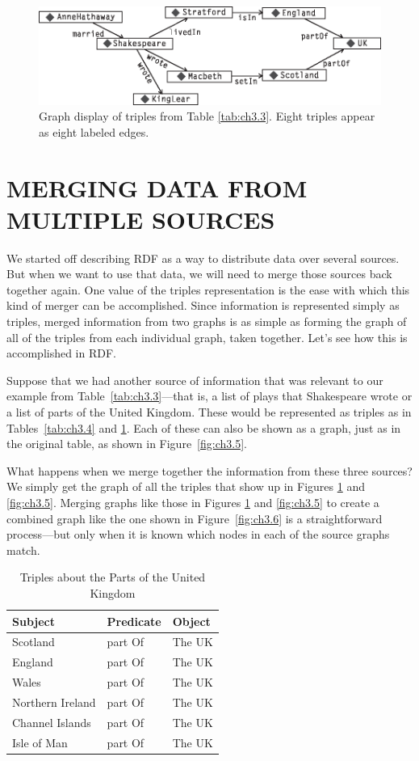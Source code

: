 \begin{figure}
    \centering
    \includegraphics[width=5.0in]{media/ch3/f03-04-9780123859655.eps}
    \caption{Graph display of triples from Table \ref{tab:ch3.3}. Eight triples appear as eight labeled edges.}
    \label{fig:ch3.4}
\end{figure}


\section{MERGING DATA FROM MULTIPLE SOURCES}

We started off describing RDF as a way to distribute data over several
sources. But when we want to use that data, we will need to merge those
sources back together again. One value of the triples representation is
the ease with which this kind of merger can be accomplished. Since
information is represented simply as triples, merged information from
two graphs is as simple as forming the graph of all of the triples from
each individual graph, taken together. Let's see how this is
accomplished in RDF.

Suppose that we had another source of information that was relevant to
our example from Table~\ref{tab:ch3.3}---that is, a list of plays that Shakespeare wrote or a list of parts
of the United Kingdom. These would be represented as triples as in
Tables~\ref{tab:ch3.4} and \ref{tab:ch3.5}. Each of these can also be shown as a graph, just as
in the original table, as shown in Figure~\ref{fig:ch3.5}.

What happens when we merge together the information from these three
sources? We simply get the graph of all the triples that show up in
Figures \ref{fig:ch3.4} and \ref{fig:ch3.5}. Merging graphs like those in Figures \ref{fig:ch3.4} and \ref{fig:ch3.5} to
create a combined graph like the one shown in Figure~\ref{fig:ch3.6} is a
straightforward process---but only when it is known which nodes in each
of the source graphs match.

\begin{table}[h]
\centering
\begin{tabular}{||l l l||} 
 \hline
 Subject&Predicate&Object \\ [0.5ex] 
 \hline\hline
Scotland&part Of&The UK \\
England&part Of&The UK \\
Wales&part Of&The UK\\
Northern Ireland&part Of&The UK \\
Channel Islands&part Of&The UK\\
Isle of Man&part Of&The UK\\
\hline
\end{tabular}
\caption{Triples about the Parts of the United Kingdom}
\label{tab:ch3.5}
\end{table}

